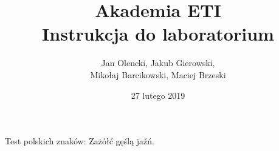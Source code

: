 \documentclass[12pt,a4paper]{article}
\begin{document}
\title{Akademia ETI\\\large Instrukcja do laboratorium}
\author{Jan Olencki, Jakub Gierowski,\\Mikołaj Barcikowski, Maciej Brzeski}
\date{27 lutego 2019}
\maketitle

Test polskich znaków:
Zażółć gęślą jaźń.
\end{document}
